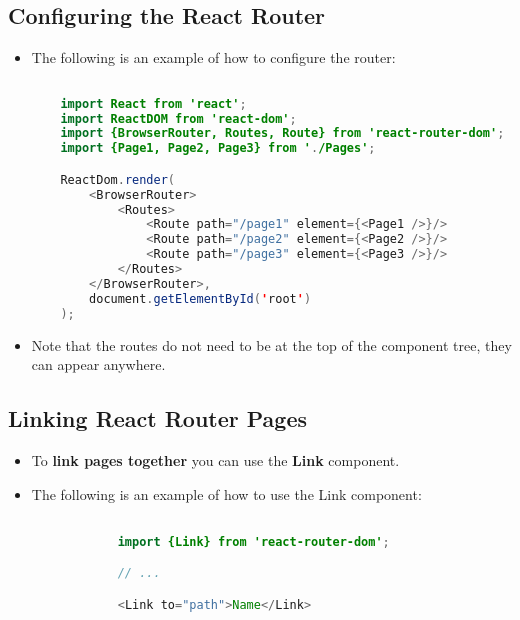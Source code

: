 \documentclass{article}
\begin{document}
    \subsection*{Configuring the React Router}
    \begin{itemize}
        \item The following is an example of how to configure the router:
        \begin{lstlisting}[language=Java]
    
    import React from 'react';
    import ReactDOM from 'react-dom';
    import {BrowserRouter, Routes, Route} from 'react-router-dom';
    import {Page1, Page2, Page3} from './Pages';

    ReactDom.render(
        <BrowserRouter>
            <Routes>
                <Route path="/page1" element={<Page1 />}/>
                <Route path="/page2" element={<Page2 />}/>
                <Route path="/page3" element={<Page3 />}/>
            </Routes>
        </BrowserRouter>,
        document.getElementById('root')
    );
        \end{lstlisting}
        \item Note that the routes do not need to be at the top of the component tree, they can appear anywhere.
    \end{itemize}

    \subsection*{Linking React Router Pages}
    \begin{itemize}
        \item To \textbf{link pages together} you can use the \textbf{Link} component.
        \item The following is an example of how to use the Link component:
        \begin{lstlisting}[language=Java]

            import {Link} from 'react-router-dom';

            // ...

            <Link to="path">Name</Link>
        \end{lstlisting}
    \end{itemize}

    \section*{}
\end{document}
